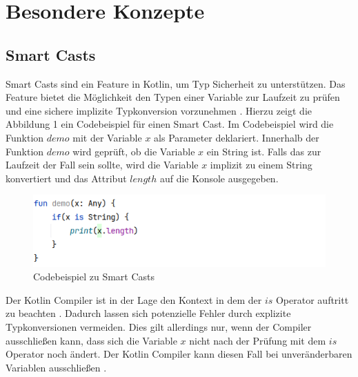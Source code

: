 \documentclass{article}
\begin{document}
\section{Besondere Konzepte}
\subsection{Smart Casts}
Smart Casts sind ein Feature in Kotlin, um Typ Sicherheit zu unterstützen. Das Feature bietet die Möglichkeit den Typen einer Variable zur Laufzeit zu prüfen und eine sichere implizite Typkonversion vorzunehmen \cite{KotlinLangDoc}. Hierzu zeigt die Abbildung 1 ein Codebeispiel für einen Smart Cast. Im Codebeispiel wird die Funktion $demo$ mit der Variable $x$ als Parameter deklariert. Innerhalb der Funktion $demo$ wird geprüft, ob die Variable $x$ ein String ist. Falls das zur Laufzeit der Fall sein sollte, wird die Variable $x$ implizit zu einem String konvertiert und das Attribut $length$ auf die Konsole ausgegeben.
\begin{figure}[!htb]
    \raggedright
    \includegraphics[width=0.85\linewidth]{img/smart_cast.png}
    \caption{Codebeispiel zu Smart Casts\footnotemark}
\end{figure}
Der Kotlin Compiler ist in der Lage den Kontext in dem der $is$ Operator auftritt zu beachten \cite{KotlinLangDoc}. Dadurch lassen sich potenzielle Fehler durch explizite Typkonversionen vermeiden. Dies gilt allerdings nur, wenn der Compiler ausschließen kann, dass sich die Variable $x$ nicht nach der Prüfung mit dem $is$ Operator noch ändert. Der Kotlin Compiler kann diesen Fall bei unveränderbaren Variablen ausschließen \cite{KotlinLangDoc}.
\end{document}

